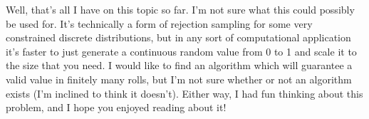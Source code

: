 \documentclass{article}
\begin{document}
\par Well, that's all I have on this topic so far. 
I'm not sure what this could possibly be used for.
It's technically a form of rejection sampling for some very constrained discrete distributions, but in any sort of computational application it's faster to just generate a continuous random value from 0 to 1 and scale it to the size that you need.
I would like to find an algorithm which will guarantee a valid value in finitely many rolls, but I'm not sure whether or not an algorithm exists (I'm inclined to think it doesn't).
Either way, I had fun thinking about this problem, and I hope you enjoyed reading about it!
\end{document}
